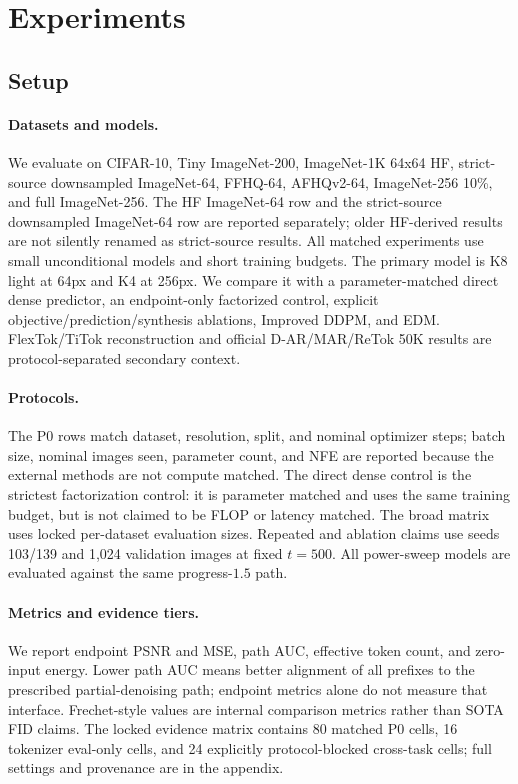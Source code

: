 \section{Experiments}

\subsection{Setup}

\paragraph{Datasets and models.}
We evaluate on CIFAR-10, Tiny ImageNet-200,
ImageNet-1K 64x64 HF, strict-source downsampled ImageNet-64, FFHQ-64,
AFHQv2-64, ImageNet-256 10\%, and full ImageNet-256. The HF ImageNet-64 row
and the strict-source downsampled ImageNet-64 row are reported separately; older
HF-derived results are not silently renamed as strict-source results.
All matched experiments use small unconditional models and short training
budgets. The primary model is K8 light \method{} at 64px and K4 at 256px. We
compare it with a parameter-matched direct dense predictor, an endpoint-only
factorized control, explicit objective/prediction/synthesis ablations, Improved
DDPM, and EDM. FlexTok/TiTok reconstruction and official D-AR/MAR/ReTok 50K
results are protocol-separated secondary context.

\paragraph{Protocols.}
The P0 rows match dataset, resolution, split, and nominal optimizer steps;
batch size, nominal images seen, parameter count, and NFE are reported because
the external methods are not compute matched. The direct dense control is the
strictest factorization control: it is parameter matched and uses the same
training budget, but is not claimed to be FLOP or latency matched.
The broad matrix uses locked per-dataset evaluation sizes. Repeated and
ablation claims use seeds 103/139 and 1,024 validation images at fixed $t=500$.
All power-sweep models are evaluated against the same progress-$1.5$ path.

\paragraph{Metrics and evidence tiers.}
We report endpoint PSNR and MSE, path AUC, effective token count, and zero-input
energy. Lower path AUC means better alignment of all prefixes
to the prescribed partial-denoising path; endpoint metrics alone do not measure
that interface. Frechet-style values are internal comparison metrics rather
than SOTA FID claims. The locked evidence matrix contains 80 matched P0 cells,
16 tokenizer eval-only cells, and 24 explicitly protocol-blocked cross-task
cells; full settings and provenance are in the appendix.


